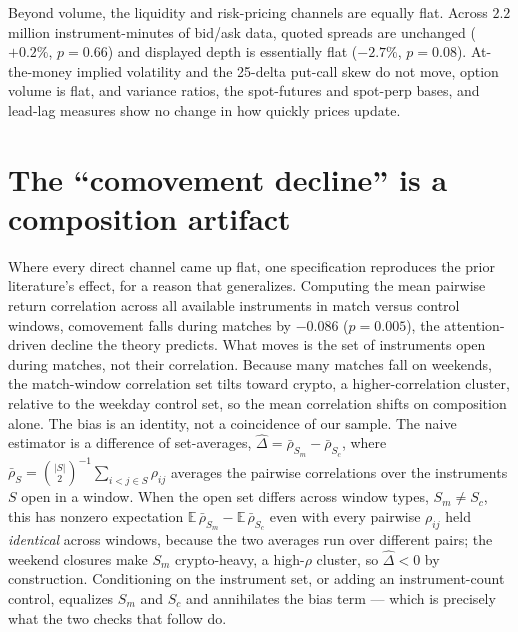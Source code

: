 \documentclass[12pt]{article}
\begin{document}
Beyond volume, the liquidity and risk-pricing channels are equally flat. Across $2.2$ million instrument-minutes of bid/ask data, quoted spreads are unchanged ($+0.2\%$, $p=0.66$) and displayed depth is essentially flat ($-2.7\%$, $p=0.08$). At-the-money implied volatility and the 25-delta put-call skew do not move, option volume is flat, and variance ratios, the spot-futures and spot-perp bases, and lead-lag measures show no change in how quickly prices update.

\section{The ``comovement decline'' is a composition artifact}\label{sec:comov}
Where every direct channel came up flat, one specification reproduces the prior literature's effect, for a reason that generalizes. Computing the mean pairwise return correlation across all available instruments in match versus control windows, comovement falls during matches by $-0.086$ ($p=0.005$), the attention-driven decline the theory predicts. What moves is the set of instruments open during matches, not their correlation. Because many matches fall on weekends, the match-window correlation set tilts toward crypto, a higher-correlation cluster, relative to the weekday control set, so the mean correlation shifts on composition alone. The bias is an identity, not a coincidence of our sample. The naive estimator is a difference of set-averages, $\widehat{\Delta}=\bar\rho_{S_m}-\bar\rho_{S_c}$, where $\bar\rho_S=\binom{|S|}{2}^{-1}\sum_{i<j\in S}\rho_{ij}$ averages the pairwise correlations over the instruments $S$ open in a window. When the open set differs across window types, $S_m\neq S_c$, this has nonzero expectation $\mathbb{E}\,\bar\rho_{S_m}-\mathbb{E}\,\bar\rho_{S_c}$ even with every pairwise $\rho_{ij}$ held \emph{identical} across windows, because the two averages run over different pairs; the weekend closures make $S_m$ crypto-heavy, a high-$\rho$ cluster, so $\widehat{\Delta}<0$ by construction. Conditioning on the instrument set, or adding an instrument-count control, equalizes $S_m$ and $S_c$ and annihilates the bias term --- which is precisely what the two checks that follow do.
\end{document}
